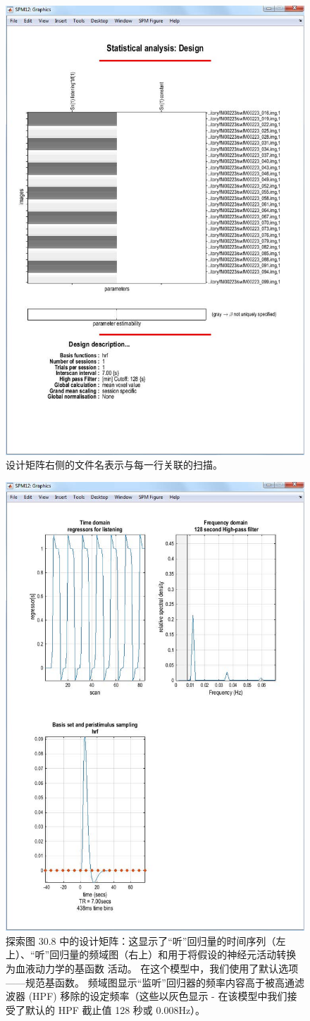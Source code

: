 \begin{figure}[htbp]
	\centering
	\includegraphics[width=0.6\linewidth]{part7/figs/fig_30_8}
	\caption{设计矩阵右侧的文件名表示与每一行关联的扫描。}
	\label{design_matrix}
\end{figure}

\begin{figure}[htbp]
	\centering
	\includegraphics[width=0.6\linewidth]{part7/figs/fig_30_9}
	\caption{探索图 30.8 中的设计矩阵：这显示了“听”回归量的时间序列（左上）、“听”回归量的频域图（右上）和用于将假设的神经元活动转换为血液动力学的基函数 活动。 在这个模型中，我们使用了默认选项——规范基函数。 频域图显示“监听”回归器的频率内容高于被高通滤波器 (HPF) 移除的设定频率（这些以灰色显示 - 在该模型中我们接受了默认的 HPF 截止值 128 秒或 0.008Hz）。}
	\label{fig_30_9}
\end{figure}

